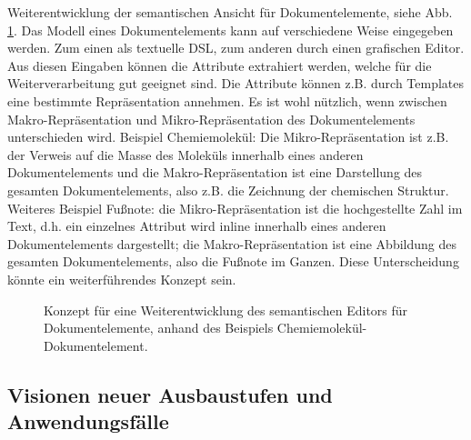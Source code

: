  
Weiterentwicklung der semantischen Ansicht für Dokumentelemente, siehe Abb. \ref{semanticeditor}. Das Modell eines Dokumentelements kann auf verschiedene Weise eingegeben werden. Zum einen als textuelle DSL, zum anderen durch einen grafischen Editor. Aus diesen Eingaben können die Attribute extrahiert werden, welche für die Weiterverarbeitung gut geeignet sind. Die Attribute können z.B. durch Templates eine bestimmte Repräsentation annehmen. Es ist wohl nützlich, wenn zwischen Makro-Repräsentation und Mikro-Repräsentation des Dokumentelements unterschieden wird. Beispiel Chemiemolekül: Die Mikro-Repräsentation ist z.B. der Verweis auf die Masse des Moleküls innerhalb eines anderen Dokumentelements und die Makro-Repräsentation ist eine Darstellung des gesamten Dokumentelements, also z.B. die Zeichnung der chemischen Struktur. Weiteres Beispiel Fußnote: die Mikro-Repräsentation ist die hochgestellte Zahl im Text, d.h. ein einzelnes Attribut wird inline innerhalb eines anderen Dokumentelements dargestellt; die Makro-Repräsentation ist eine Abbildung des gesamten Dokumentelements, also die Fußnote im Ganzen. Diese Unterscheidung könnte ein weiterführendes Konzept sein.

 
\begin{figure}[h!]
\centering
\advance\leftskip-2.5cm
\caption[Weiterentwicklung der Dokumentelement Editoransicht]{ Konzept für eine Weiterentwicklung des semantischen Editors für Dokumentelemente, anhand des Beispiels Chemiemolekül-Dokumentelement. }\label{semanticeditor}
\end{figure}
 
\subsection{Visionen neuer Ausbaustufen und Anwendungsfälle}\label{}
 
